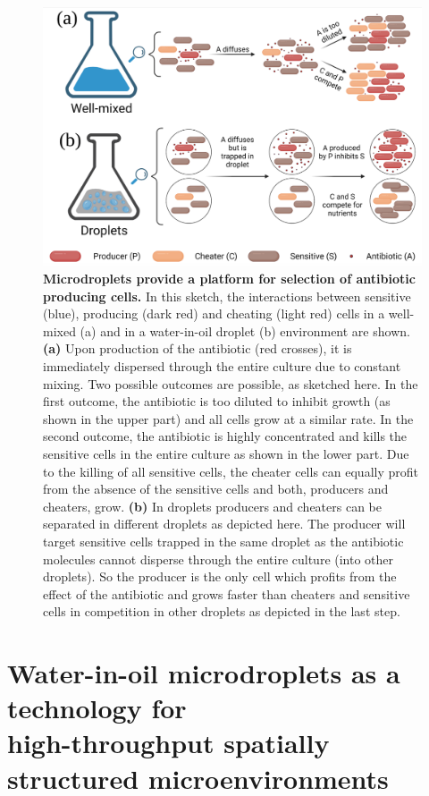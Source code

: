\begin{figure}
\includegraphics[width=\linewidth]{graphics/2025_09_30_droplets_fig1.png}

\caption{\textbf{Microdroplets provide a platform for selection of antibiotic producing cells.} In this sketch, the interactions between sensitive (blue), producing (dark red) and cheating (light red) cells in a well-mixed (a) and in a water-in-oil droplet (b) environment are shown. \textbf{(a)} Upon production of the antibiotic (red crosses), it is immediately dispersed through the entire culture due to constant mixing. Two possible outcomes are possible, as sketched here. In the first outcome, the antibiotic is too diluted to inhibit growth (as shown in the upper part) and all cells grow at a similar rate. In the second outcome, the antibiotic is highly concentrated and kills the sensitive cells in the entire culture as shown in the lower part. Due to the killing of all sensitive cells, the cheater cells can equally profit from the absence of the sensitive cells and both, producers and cheaters, grow. \textbf{(b)} In droplets producers and cheaters can be separated in different droplets as depicted here. The producer will target sensitive cells trapped in the same droplet as the antibiotic molecules cannot disperse through the entire culture (into other droplets). So the producer is the only cell which profits from the effect of the antibiotic and grows faster than cheaters and sensitive cells in competition in other droplets as depicted in the last step.}
\label{fig:intro_droplets_idea}
\end{figure}

\section{Water-in-oil microdroplets as a technology for \\ high-throughput spatially structured microenvironments}


